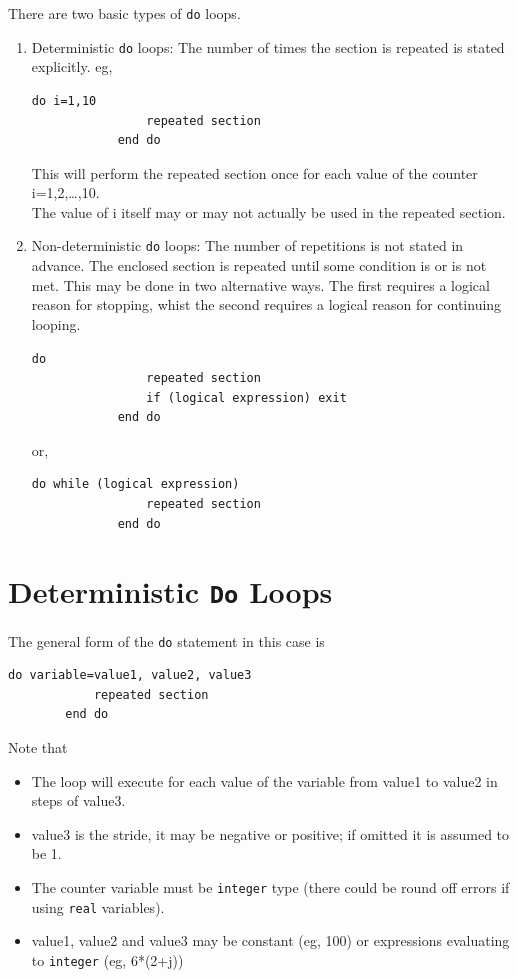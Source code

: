 \documentclass[12pt,oneside]{book}
\newcommand{\code}[1]{\lstinline[keywordstyle=\color{black},basicstyle=\ttfamily]{#1}}
\begin{document}
    There are two basic types of \code{do} loops.
    \begin{enumerate}[label=(\alph*)]
        \item Deterministic \code{do} loops: The number of times the section is repeated is stated explicitly. eg,
        \begin{lstlisting}[numbers=none]
            do i=1,10
                repeated section
            end do
        \end{lstlisting}
        This will perform the repeated section once for each value of the counter i=1,2,\dots,10.\\
        The value of i itself may or may not actually be used in the repeated section.
        \item Non-deterministic \code{do} loops: The number of repetitions is not stated in advance.
        The enclosed section is repeated until some condition is or is not met.
        This may be done in two alternative ways. 
        The first requires a logical reason for stopping, whist the second requires a logical reason for continuing looping.
        \begin{lstlisting}[numbers=none]
            do
                repeated section
                if (logical expression) exit
            end do
        \end{lstlisting}
        or,
        \begin{lstlisting}[numbers=none]
            do while (logical expression)
                repeated section
            end do
        \end{lstlisting}
    \end{enumerate}
    \section{Deterministic \code{Do} Loops}
    The general form of the \code{do} statement in this case is 
    \begin{lstlisting}[numbers=none]
        do variable=value1, value2, value3
            repeated section
        end do
    \end{lstlisting}
    Note that
    \begin{itemize}
        \item The loop will execute for each value of the variable from value1 to value2 in steps of value3.
        \item value3 is the stride, it may be negative or positive; if omitted it is assumed to be 1.
        \item The counter variable must be \code{integer} type (there could be round off errors if using \code{real} variables).
        \item value1, value2 and value3 may be constant (eg, 100) or expressions evaluating to \code{integer} (eg, 6*(2+j))
    \end{itemize}
\end{document}
